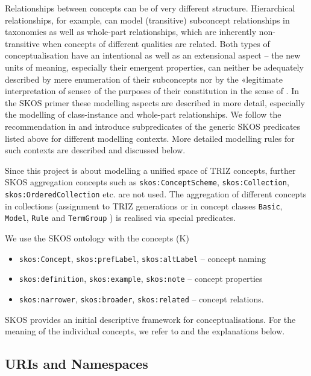\documentclass[11pt,a4paper]{article}
\begin{document}
Relationships between concepts can be of very different structure.
Hierarchical relationships, for example, can model (transitive) subconcept
relationships in taxonomies as well as whole-part relationships, which are
inherently non-transitive when concepts of different qualities are related.
Both types of conceptualisation have an intentional as well as an extensional
aspect -- the new units of meaning, especially their emergent properties, can
neither be adequately described by mere enumeration of their subconcepts nor
by the «legitimate interpretation of sense» of the purposes of their
constitution in the sense of \cite{BergerLuckmann}. In the SKOS primer
\cite{SKOS-Primer} these modelling aspects are described in more detail,
especially the modelling of class-instance and whole-part relationships. We
follow the recommendation in \cite[Sect 4.7]{SKOS-Primer} and introduce
subpredicates of the generic SKOS predicates listed above for different
modelling contexts. More detailed modelling rules for such contexts are
described and discussed below.

Since this project is about modelling a unified space of TRIZ concepts,
further SKOS aggregation concepts such as \texttt{skos:ConceptScheme},
\texttt{skos:Collection}, \texttt{skos:OrderedCollection} etc. are not used.
The aggregation of different concepts in collections (assignment to TRIZ
generations \cite[Table 1]{TOP2020} or in concept classes \texttt{Basic},
\texttt{Model}, \texttt{Rule} and \texttt{TermGroup} \cite[Fig. 4]{TOP2020})
is realised via special predicates.

We use the SKOS ontology \cite{SKOS} with the concepts (K)
\begin{itemize}[noitemsep]
\item \texttt{skos:Concept}, \texttt{skos:prefLabel}, \texttt{skos:altLabel}
  -- concept naming
\item \texttt{skos:definition}, \texttt{skos:example}, \texttt{skos:note} --
  concept properties
\item \texttt{skos:narrower}, \texttt{skos:broader}, \texttt{skos:related} --
  concept relations.
\end{itemize}
SKOS provides an initial descriptive framework for conceptualisations.  For
the meaning of the individual concepts, we refer to \cite{SKOS} and the
explanations below.

\subsection{URIs and Namespaces}
\end{document}
